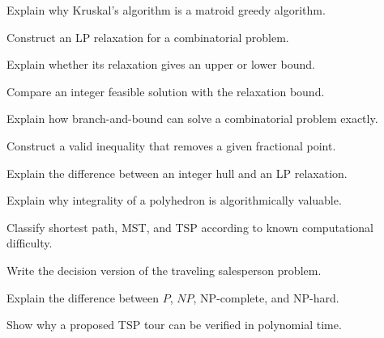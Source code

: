 \begin{exercise}[3]
Explain why Kruskal's algorithm is a matroid greedy algorithm.
\end{exercise}

\begin{exercise}[3]
Construct an LP relaxation for a combinatorial problem.
\end{exercise}

\begin{exercise}[3]
Explain whether its relaxation gives an upper or lower bound.
\end{exercise}

\begin{exercise}[3]
Compare an integer feasible solution with the relaxation bound.
\end{exercise}

\begin{exercise}[3]
Explain how branch-and-bound can solve a combinatorial problem exactly.
\end{exercise}

\begin{exercise}[3]
Construct a valid inequality that removes a given fractional point.
\end{exercise}

\begin{exercise}[3]
Explain the difference between an integer hull and an LP relaxation.
\end{exercise}

\begin{exercise}[3]
Explain why integrality of a polyhedron is algorithmically valuable.
\end{exercise}

\begin{exercise}[3]
Classify shortest path, MST, and TSP according to known computational
difficulty.
\end{exercise}

\begin{exercise}[3]
Write the decision version of the traveling salesperson problem.
\end{exercise}

\begin{exercise}[3]
Explain the difference between \(P\), \(NP\), NP-complete, and NP-hard.
\end{exercise}

\begin{exercise}[3]
Show why a proposed TSP tour can be verified in polynomial time.
\end{exercise}

